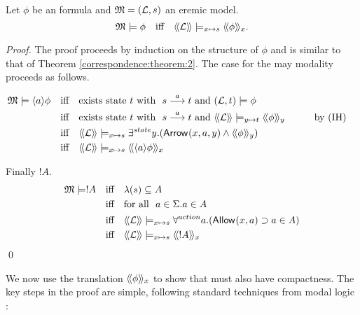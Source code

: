 \begin{theorem}\label{correspondence:theorem:2}
Let $\phi$ be an \ELABR{} formula and $\frak{M} = (\mathcal{L}, s)$ an eremic
model.
\[
   \frak{M} \models \phi \quad  \text{iff} \quad \langle\!\langle \mathcal{L} \rangle\!\rangle \models_{x \mapsto s} \langle\!\langle \phi \rangle\!\rangle_x.
\]
\end{theorem}
\begin{proof}
The proof proceeds by induction on the structure of $\phi$ and is
similar to that of Theorem \ref{correspondence:theorem:2}.
The case for the may modality proceeds as follows.  

\begin{alignat*}{2}
  \MMM \models \MAY{a}\phi
     &\quad\text{iff}\quad 
  \text{exists state $t$ with }\ s \TRANS{a} t\ \text{and}\ (\LLL, t) \models \phi \\
     &\quad\text{iff}\quad
  \text{exists state $t$ with }\ s \TRANS{a} t\ \text{and}\ \SEMBTWO{\LLL} \models_{y \mapsto t} \SEMBTWO{\phi}_y &\qquad& \text{by (IH)}\\
     &\quad\text{iff}\quad
  \SEMBTWO{\LLL} \models_{x \mapsto s} \exists^{state} y.(\ARROWTWO{}{x}{a}{y} \AND \SEMBTWO{\phi}_y) \\
     &\quad\text{iff}\quad
   \SEMBTWO{\LLL} \models_{x \mapsto s} \SEMBTWO{\MAY{a}{\phi}}_x
\end{alignat*}

Finally $!A$.
\begin{alignat*}{2}
  \frak{M} \models !A
     &\quad\text{iff}\quad
  \lambda (s) \subseteq A \\
      &\quad\text{iff}\quad
  \text{for all }\ a \in \Sigma. a \in A \\
     &\quad\text{iff}\quad
  \langle\!\langle \mathcal{L} \rangle\!\rangle \models_{x \mapsto s} \forall^{action} a. (\mathsf{Allow}^{}(x, a) \supset a \in A) \\
     &\quad\text{iff}\quad
  \langle\!\langle \mathcal{L} \rangle\!\rangle \models_{x \mapsto s} \langle\!\langle !A \rangle\!\rangle_x
\end{alignat*}
\qed
\end{proof}

\NI We now use the translation $\langle\!\langle \phi \rangle\!\rangle_x$ to show that \ELABR{} must also have compactness. The key steps in the proof are
simple, following standard techniques from modal logic
\cite{BlackburnP:modlog}:

